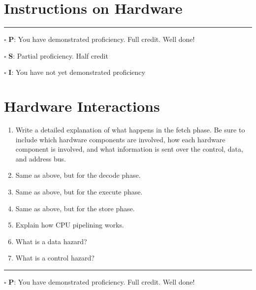 \documentclass[12pt]{article}
\begin{document}
\section*{Instructions on Hardware}

\begin{enumerate}

\end{enumerate}

\vfill

\rule[1ex]{\textwidth}{.1pt}

$\square$ \textbf{P}: You have demonstrated proficiency. Full credit. Well done!

$\square$ \textbf{S}: Partial proficiency. Half credit

$\square$ \textbf{I}: You have not yet demonstrated proficiency

\newpage



\section*{Hardware Interactions}


\begin{enumerate}
\item Write a detailed explanation of what happens in the fetch phase. Be sure to include which hardware components are involved, how each hardware component is involved, and what information is sent over the control, data, and address bus.
\vfill

\item Same as above, but for the decode phase.
\vfill

\item Same as above, but for the execute phase.
\vfill

\item Same as above, but for the store phase.
\vfill

\item Explain how CPU pipelining works.
\vfill

\item What is a data hazard?
\vfill

\item What is a control hazard?
\end{enumerate}

\vfill

\rule[1ex]{\textwidth}{.1pt}

$\square$ \textbf{P}: You have demonstrated proficiency. Full credit. Well done!
\end{document}
